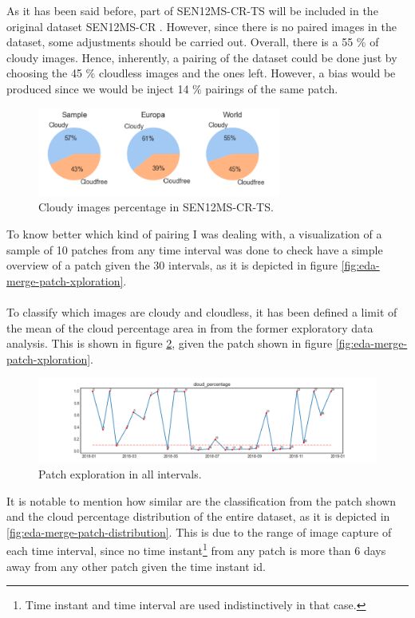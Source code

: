 As it has been said before, part of SEN12MS-CR-TS \cite{sen12mscrts} will be included in the original dataset SEN12MS-CR \cite{sen12mscr}. However, since there is no paired images in the dataset, some adjustments should be carried out.
Overall, there is a 55 \% of cloudy images. Hence, inherently, a pairing of the dataset could be done just by choosing the 45 \% cloudless images and the ones left. However, a bias would be produced since we would be inject 14 \% pairings of the same patch.
\begin{figure}[H]
	\centering
	\includegraphics[width=8cm]{imgs/eda/merge/cloudies}
	\caption{Cloudy images percentage in SEN12MS-CR-TS.}
	\label{fig:eda-merge-classifcation}
\end{figure}
To know better which kind of pairing I was dealing with, a visualization of a sample of 10 patches from any time interval was done to check have a simple overview of a patch given the 30 intervals, as it is depicted in figure \ref{fig:eda-merge-patch-xploration}.
\\
\\
To classify which images are cloudy and cloudless, it has been defined a limit of the mean of the cloud percentage area in \cite{sen12mscr} from the former exploratory data analysis. This is shown in figure \ref{fig:eda-merge-classifcation}, given the patch shown in figure \ref{fig:eda-merge-patch-xploration}.
\begin{figure}[H]
	\centering
	\begin{adjustwidth}{-2cm}{}
	\includegraphics[width=18cm]{imgs/eda/merge/cloud-percentages-patch-plot}
	\end{adjustwidth}
	\caption{Patch exploration in all intervals.}
	\label{fig:eda-merge-classifcation}
\end{figure}
It is notable to mention how similar are the classification from the patch shown and the cloud percentage distribution of the entire dataset, as it is depicted in \ref{fig:eda-merge-patch-distribution}. This is due to the range of image capture of each time interval, since no time instant\footnote{Time instant and time interval are used indistinctively in that case.} from any patch is more than 6 days away from any other patch given the time instant id. 
